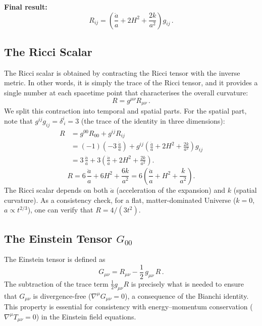\medskip\noindent\textbf{Final result:}
\begin{equation}
\boxed{R_{ij} = \left(\frac{\ddot{a}}{a} + 2H^2 + \frac{2k}{a^2}\right)g_{ij}\,.}
\end{equation}

\subsection{The Ricci Scalar}

The Ricci scalar is obtained by contracting the Ricci tensor with the inverse metric. In other words, it is simply the trace of the Ricci tensor, and it provides a single number at each spacetime point that characterises the overall curvature:
\begin{equation}
    R = g^{\mu\nu}R_{\mu\nu}\,.
\end{equation}
We split this contraction into temporal and spatial parts. For the spatial part, note that $g^{ij}g_{ij}=\delta^i_{\ i}=3$ (the trace of the identity in three dimensions):
\begin{align}
    R &= g^{00}R_{00} + g^{ij}R_{ij} \nonumber\\[4pt]
      &= (-1)\!\left(-3\,\frac{\ddot{a}}{a}\right) + g^{ij}\!\left(\frac{\ddot{a}}{a}+2H^2+\frac{2k}{a^2}\right)g_{ij} \nonumber\\[4pt]
      &= 3\,\frac{\ddot{a}}{a} + 3\!\left(\frac{\ddot{a}}{a}+2H^2+\frac{2k}{a^2}\right).
\end{align}
\begin{equation}
\boxed{R = 6\,\frac{\ddot{a}}{a} + 6H^2 + \frac{6k}{a^2} = 6\!\left(\frac{\ddot{a}}{a} + H^2 + \frac{k}{a^2}\right).}
\end{equation}
The Ricci scalar depends on both $\ddot{a}$ (acceleration of the expansion) and $k$ (spatial curvature). As a consistency check, for a flat, matter-dominated Universe ($k=0$, $a\propto t^{2/3}$), one can verify that $R=4/(3t^2)$.

\subsection*{The Einstein Tensor $G_{00}$}

The Einstein tensor is defined as
\begin{equation}
    G_{\mu\nu} = R_{\mu\nu} - \frac{1}{2}\,g_{\mu\nu}\,R\,.
\end{equation}
The subtraction of the trace term $\frac{1}{2}g_{\mu\nu}R$ is precisely what is needed to ensure that $G_{\mu\nu}$ is divergence-free ($\nabla^\mu G_{\mu\nu}=0$), a consequence of the Bianchi identity. This property is essential for consistency with energy--momentum conservation ($\nabla^\mu T_{\mu\nu}=0$) in the Einstein field equations.

